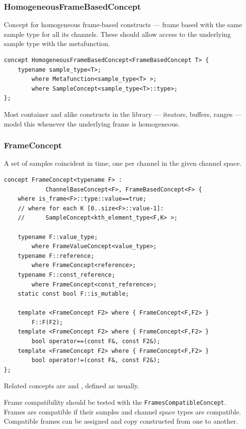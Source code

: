 \subsubsection{{HomogeneousFrameBasedConcept}}

Concept for homogeneous frame-based constructs --- frame based with
the same sample type for all its channels. These should allow access
to the underlying sample type with the 
metafunction.

\begin{lstlisting}
concept HomogeneousFrameBasedConcept<FrameBasedConcept T> {
    typename sample_type<T>;         
        where Metafunction<sample_type<T> >;
        where SampleConcept<sample_type<T>::type>;
};
\end{lstlisting}

Most container and alike constructs in the library --- iteators,
buffers, ranges --- model this whenever the underlying frame is
homogeneous.

\subsubsection{{FrameConcept}}

A set of samples coincident in time, one per channel in the given
channel space.

\begin{lstlisting}
concept FrameConcept<typename F> :
            ChannelBaseConcept<F>, FrameBasedConcept<F> {    
    where is_frame<F>::type::value==true;
    // where for each K [0..size<F>::value-1]:
    //      SampleConcept<kth_element_type<F,K> >;
        
    typename F::value_type;       
        where FrameValueConcept<value_type>;
    typename F::reference;
        where FrameConcept<reference>;
    typename F::const_reference;  
        where FrameConcept<const_reference>;
    static const bool F::is_mutable;

    template <FrameConcept F2> where { FrameConcept<F,F2> } 
        F::F(F2);
    template <FrameConcept F2> where { FrameConcept<F,F2> } 
        bool operator==(const F&, const F2&);
    template <FrameConcept F2> where { FrameConcept<F,F2> } 
        bool operator!=(const F&, const F2&);
}; 
\end{lstlisting}

Related concepts are  and
, defined as usually.

Frame compatibility should be tested with the
\texttt{Frames\-Compatible\-Concept}.  Frames are compatible if their
samples and channel space types are compatible. Compatible frames can
be assigned and copy constructed from one to another.

